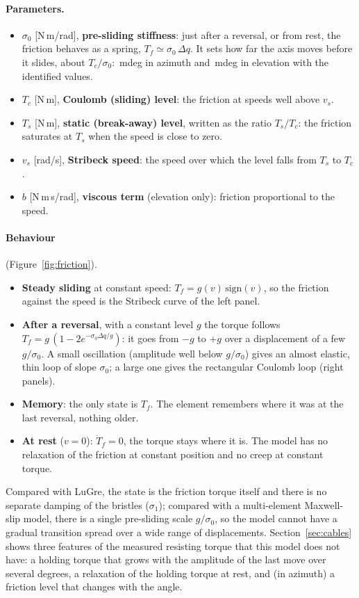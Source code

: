 \documentclass[10pt,a4paper]{article}
\numberwithin{equation}{section}
\begin{document}
\paragraph{Parameters.}
\begin{itemize}
\item $\sigma_0$ [N\,m/rad], \textbf{pre-sliding stiffness}: just after a reversal, or from rest, the friction behaves as a spring, $T_f\simeq\sigma_0\,\Delta q$. It sets how far the axis moves before it slides, about $T_c/\sigma_0$: \preAz\,mdeg in azimuth and \preEl\,mdeg in elevation with the identified values.
\item $T_c$ [N\,m], \textbf{Coulomb (sliding) level}: the friction at speeds well above $v_s$.
\item $T_s$ [N\,m], \textbf{static (break-away) level}, written as the ratio $T_s/T_c$: the friction saturates at $T_s$ when the speed is close to zero.
\item $v_s$ [rad/s], \textbf{Stribeck speed}: the speed over which the level falls from $T_s$ to $T_c$.
\item $b$ [N\,m\,s/rad], \textbf{viscous term} (elevation only): friction proportional to the speed.
\end{itemize}

\paragraph{Behaviour} (Figure~\ref{fig:friction}).
\begin{itemize}
\item \textbf{Steady sliding} at constant speed: $T_f=g(v)\,\mathrm{sign}(v)$, so the friction against the speed is the Stribeck curve of the left panel.
\item \textbf{After a reversal}, with a constant level $g$ the torque follows $T_f=g\,(1-2e^{-\sigma_0\Delta q/g})$: it goes from $-g$ to $+g$ over a displacement of a few $g/\sigma_0$. A small oscillation (amplitude well below $g/\sigma_0$) gives an almost elastic, thin loop of slope $\sigma_0$; a large one gives the rectangular Coulomb loop (right panels).
\item \textbf{Memory}: the only state is $T_f$. The element remembers where it was at the last reversal, nothing older.
\item \textbf{At rest} ($v=0$): $\dot T_f=0$, the torque stays where it is. The model has no relaxation of the friction at constant position and no creep at constant torque.
\end{itemize}
Compared with LuGre, the state is the friction torque itself and there is no separate damping of the bristles ($\sigma_1$); compared with a multi-element Maxwell-slip model, there is a single pre-sliding scale $g/\sigma_0$, so the model cannot have a gradual transition spread over a wide range of displacements. Section~\ref{sec:cables} shows three features of the measured resisting torque that this model does not have: a holding torque that grows with the amplitude of the last move over several degrees, a relaxation of the holding torque at rest, and (in azimuth) a friction level that changes with the angle.
\end{document}
